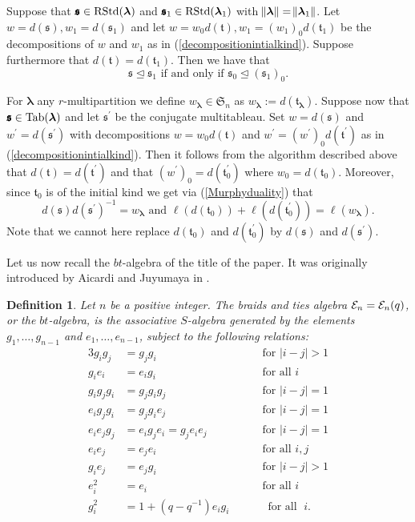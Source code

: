 \documentclass[10pt,a4,twoside,hidelinks,rm]{article}
\newcommand{\bT}{\pmb{\mathfrak{t}}}
\newcommand{\Bs}{\pmb{\mathfrak{s}}}
\newcommand{\Si}{\mathfrak{S}}
\newcommand{\rstd}{{\rm RStd}}
\newcommand{\Tab}{{\rm Tab}}
\newcommand{\E}{ {\mathcal E}_n(q)}
\newcommand\blambda{{\boldsymbol\lambda}}
\theoremstyle{plain}
\newtheorem{defi}[teo]{Definition}%
\begin{document}
Suppose that $ \Bs \in \rstd(\blambda) $ and $ 
\Bs_1 \in \rstd(\blambda_1) $ 
with $ \norm{\blambda} = \norm{\blambda_1} $.
Let $ w = d(\Bs),  w_1 = d(\Bs_1 ) $
and let $ w= w_0 d(\bT), w_1= (w_1)_0 d(\bT_1) $ be the decompositions of $ w $ and $ w_1 $ 
as in (\ref{decompositionintialkind}). 
Suppose furthermore that 
$d(\bT) = d(\bT_1) $. 
Then we have that 
\begin{equation}\label{thenweave}
\Bs \unlhd \Bs_1 \mbox{ if and only if } \Bs_0 \unlhd (\Bs_1)_0.
\end{equation}

For $ \blambda $ any $r$-multi\-partition 
we define $ w_{\blambda} \in \Si_n $ as $ w_{\blambda} := d(\bT_{\blambda}) $.
Suppose now that $ \Bs \in \Tab(\blambda)  $ and let $ \Bs^{\prime} $ be the
conjugate multitableau.
Set
$ w = d(\Bs) $ and $ w^{\prime} = d(\Bs^{\prime}) $ with 
decompositions 
$ w = w_0 d(\bT)  $ and $ w^{\prime} = (w^{\prime})_0 d(\bT^{\prime})  $ 
as in (\ref{decompositionintialkind}). Then it follows from the algorithm described above that
$ d(\bT) = d(\bT^{\prime}) $ and that $ (w^{\prime})_0 = d(\bT_0^{\prime}) $ where
$ w_0  = d(\bT_0) $. Moreover, since $ \bT_0 $ is of the initial kind 
we get via (\ref{Murphyduality}) that
\begin{equation}\label{22}
 d(\Bs) d(\Bs^{\prime})^{-1} =
  w_{\blambda} \mbox{  and }  \ell(d(\bT_0)) + \ell(d(\bT_0^{\prime})) = \ell( w_{\blambda}). 
\end{equation}  
Note that we cannot here replace $ d(\bT_0) $ and $ d(\bT_0^{\prime}) $ by
$ d(\Bs) $ and $ d(\Bs^{\prime}) $.

\medskip

Let us now recall the $bt$-algebra of the title of the paper.
It was originally introduced by Aicardi and Juyumaya in \cite{AJ1}.
\begin{defi}\label{braidsties}
  Let $n$ be a positive integer.  The braids and ties algebra
  ${\cal E}_n = \E $, or the $bt$-algebra, is the associative $S$-algebra generated by the
elements $g_1,\ldots,g_{n-1} $ and $e_1, \ldots, e_{n-1}$, subject to the
following relations:
\begin{alignat}{3}
g_ig_j&=g_jg_i&&\quad\mbox{ for } |i-j|>1\label{E1}\\
g_ie_i&=e_ig_i&& \quad \mbox{ for all } i \label{E2}\\
g_ig_{j}g_i&=g_{j}g_ig_{j}&&\quad\mbox{ for }  |i-j|=1 \label{E3}\\
e_ig_{j}g_i&=g_{j}g_ie_{j}&&\quad\mbox{ for }  |i-j|=1 \label{E4}\\
e_ie_{j}g_j&=e_{i}g_je_{i}=g_{j}e_ie_{j}   &&\quad\mbox{ for }  |i-j|=1 \label{E5}\\
e_ie_j&=e_je_i&&\quad\mbox{ for all } i,j\label{E6}\\
g_ie_j&=e_jg_i&&\quad\mbox{ for } |i-j|>1\label{E7}\\
e_i^2&=e_i&&\quad\mbox{ for all } i\label{E8} \\
g_i^2&=1+(q-q^{-1})e_ig_i  && \, \, \, \, \, \, \, \, \,  \mbox{  for all }\; i\label{E9}.
\end{alignat}
\end{defi}
\end{document}

